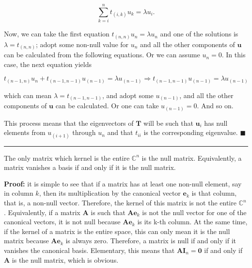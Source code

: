 \begin{equation} \sum_{k=i}^n t_{(i,k)} u_k = \lambda u_i .\end{equation}

	Now, we can take the first equation $t_{(n,n)}u_n = \lambda u_n$ and one of the solutions is $\lambda = t_{(n,n)}$; adopt some non-null value for $u_n$ and all the other components of $\mathbf{u}$ can be calculated from the following equations. Or we can assume $u_n = 0$. In this case, the next equation yields

\begin{equation} t_{(n-1,n)}u_{n} + t_{(n-1,n-1)}u_{(n-1)} = \lambda u_{(n-1)} \Rightarrow t_{(n-1,n-1)}u_{(n-1)} = \lambda u_{(n-1)} \end{equation}

	\noindent which can mean $\lambda = t_{(n-1,n-1)}$, and adopt some $u_{(n-1)}$, and all the other components of $\mathbf{u}$ can be calculated. Or one can take $u_{(n-1)} = 0$. And so on.

	This process means that the eigenvectors of $\mathbf{T}$ will be such that $\mathbf{u}_i$ has null elements from $u_{(i+1)}$ through $u_n$ and that $t_{ii}$ is the corresponding eigenvalue.
\hfill$\blacksquare$
\vspace{5mm}
\hrule
\vspace{5mm} %
\begin{lemma}\label{lemma:null_matrix} %
	The only matrix which kernel is the entire $\mathbb{C}^n$ is the null matrix. Equivalently, a matrix vanishes a basis if and only if it is the null matrix.
\end{lemma}
\noindent\textbf{Proof:} it is simple to see that if a matrix has at least one non-null element, say in column $k$, then its multiplication by the canonical vector $\mathbf{e}_k$ is that column, that is, a non-null vector. Therefore, the kernel of this matrix is not the entire $\mathbb{C}^n$. Equivalently, if a matrix $\mathbf{A}$ is such that $\mathbf{Ae}_k$ is not the null vector for one of the canonical vectors, it is not null because $\mathbf{Ae}_k$ is its k-th column. At the same time, if the kernel of a matrix is the entire space, this can only mean it is the null matrix because $\mathbf{Ae}_k$ is always zero. Therefore, a matrix is null if and only if it vanishes the canonical basis. Elementary, this means that $\mathbf{AI}_n = \mathbf{0}$ if and only if $\mathbf{A}$ is the null matrix, which is obvious.

